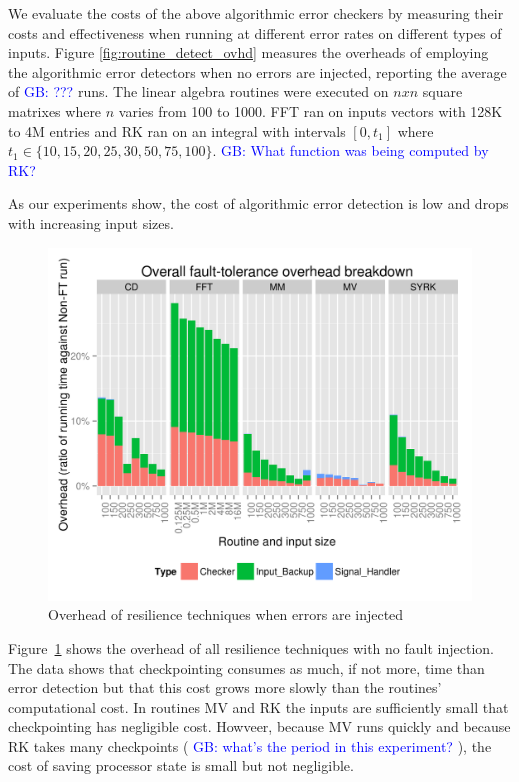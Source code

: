 \documentclass{sig-alternate}
\newcommand{\greg}[1]{%
  \textcolor{blue}{GB: #1}
}
\begin{document}
We evaluate the costs of the above algorithmic error checkers by measuring their costs and effectiveness when running at different error rates on different types of inputs.
Figure \ref{fig:routine_detect_ovhd} measures the overheads of employing the algorithmic error detectors when no errors are injected, reporting the average of \greg{???} runs.
The linear algebra routines were executed on $nxn$ square matrixes where $n$ varies from 100 to 1000.
FFT ran on inputs vectors with 128K to 4M entries and RK ran on an integral with intervals $[0, t_1]$ where $t_1 \in \{10, 15, 20, 25, 30, 50, 75, 100\}$. \greg{What function was being computed by RK?}
As our experiments show, the cost of algorithmic error detection is low and drops with increasing input sizes.

\begin{figure}[ht!]
\centering
\includegraphics[width=1.00\columnwidth]{figs/4_1_1_Overall_Breakdown.png}
\caption{Overhead of resilience techniques when errors are injected}
\label{fig:routine_all_ovhd}
\end{figure}

Figure~\ref{fig:routine_all_ovhd} shows the overhead of all resilience techniques with no fault injection.
The data shows that checkpointing consumes as much, if not more, time than error detection but that this cost grows more slowly than the routines' computational cost.
In routines MV and RK the inputs are sufficiently small that checkpointing has negligible cost.
Howveer, because MV runs quickly and because RK takes many checkpoints (\greg{what's the period in this experiment?}), the cost of saving processor state is small but not negligible.
\end{document}
